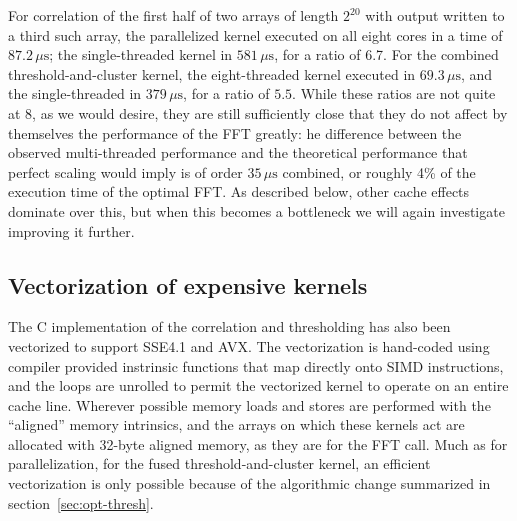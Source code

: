 For correlation of the first half of two arrays of length $2^{20}$ with output
written to a third such array, the parallelized kernel executed on all eight
cores in a time of $87.2\,\mu\mathrm{s}$; the single-threaded kernel in
$581\,\mu\mathrm{s}$, for a ratio of 6.7.  For the combined
threshold-and-cluster kernel, the eight-threaded kernel executed in
$69.3\,\mu\mathrm{s}$, and the single-threaded in $379\,\mu\mathrm{s}$, for a
ratio of $5.5$.  While these ratios are not quite at 8, as we would desire, they
are still sufficiently close that they do not affect by themselves the
performance of the FFT greatly: he difference between the observed
multi-threaded performance and the theoretical performance that perfect scaling
would imply is of order $35\,\mu\mathrm{s}$ combined, or roughly 4\% of the
execution time of the optimal FFT. As described below, other cache effects
dominate over this, but when this becomes a bottleneck we will again investigate
improving it further.

\vspace*{-10pt}
\subsection{Vectorization of expensive kernels}
\vspace*{-05pt}
\label{sec:vect-expens-kern}

The C implementation of the correlation and thresholding has also been vectorized to
support SSE4.1 and AVX. 
The vectorization is hand-coded using compiler
provided instrinsic functions that map directly onto SIMD instructions, and the
loops are unrolled to permit the vectorized kernel to operate on an entire cache
line. Wherever possible memory loads and stores are performed with the
``aligned'' memory intrinsics, and the arrays on which these kernels act are
allocated with 32-byte aligned memory, as they are for the FFT call. Much as for
parallelization, for the fused threshold-and-cluster kernel, an efficient
vectorization is only possible because of the algorithmic change summarized in
section~\ref{sec:opt-thresh}. 

